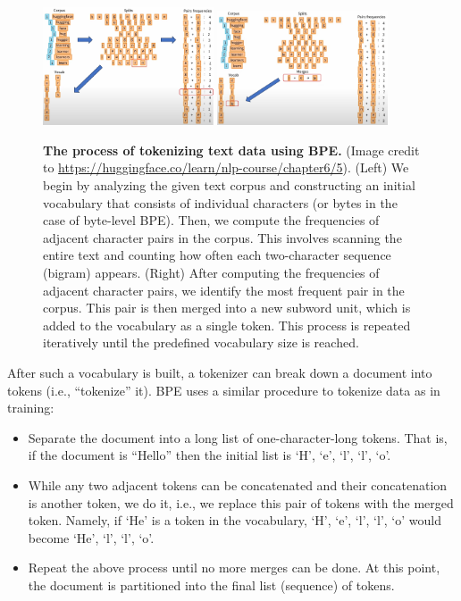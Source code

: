 \documentclass[../../book-main.tex]{subfiles}
\begin{document}
\begin{figure}
    \centering
    \includegraphics[width=0.45\textwidth]{chapters/chapter7/figs/BPE1.png}\hspace{0.6in} 
    \includegraphics[width=0.45\textwidth]{chapters/chapter7/figs/BPE2.png} 
    \caption{\small {\bf The process of tokenizing text data using BPE.} (Image credit to \url{https://huggingface.co/learn/nlp-course/chapter6/5}). (Left) We begin by analyzing the given text corpus and constructing an initial vocabulary that consists of individual characters (or bytes in the case of byte-level BPE). Then, we compute the frequencies of adjacent character pairs in the corpus. This involves scanning the entire text and counting how often each two-character sequence (bigram) appears. (Right) After computing the frequencies of adjacent character pairs, we identify the most frequent pair in the corpus. This pair is then merged into a new subword unit, which is added to the vocabulary as a single token. This process is repeated iteratively until the predefined vocabulary size is reached. }
    \label{fig:BPE}
\end{figure}
After such a vocabulary is built, a tokenizer can break down a document into tokens (i.e., ``tokenize'' it). BPE uses a similar procedure to tokenize data as in training:
\begin{itemize}
    \item Separate the document into a long list of one-character-long tokens. That is, if the document is ``Hello'' then the initial list is `H', `e', `l', `l', `o'. 
    \item While any two adjacent tokens can be concatenated and their concatenation is another token, we do it, i.e., we replace this pair of tokens with the merged token. Namely, if `He' is a token in the vocabulary, `H', `e', `l', `l', `o' would become `He', `l', `l', `o'.
    \item Repeat the above process until no more merges can be done. At this point, the document is partitioned into the final list (sequence) of tokens.
\end{itemize}
\end{document}
